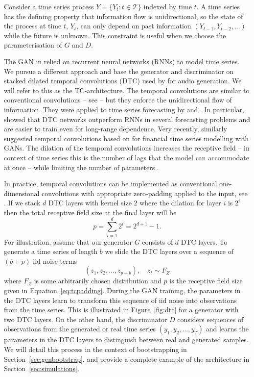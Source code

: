 \documentclass[12pt]{article}
\begin{document}
Consider a time series process $Y = \{ Y_t : t \in \mathcal{T} \}$ indexed by time $t$. A time series has the defining property that information flow is unidirectional, so the state of the process at time $t$, $Y_t$, can only depend on past information $(Y_{t-1}, Y_{t-2}, ...)$ while the future is unknown. This constraint is useful when we choose the parameterisation of $G$ and $D$. 

The GAN in \citet{esteban2017real} relied on recurrent neural networks (RNNs) to model time series. We pursue a different approach and base the generator and discriminator on stacked dilated temporal convolutions (DTC) used by \citet{oord2016wavenet} for audio generation. We will refer to this as the TC-architecture. The temporal convolutions are similar to conventional convolutions -- see \citep[Chp. 3]{goodfellow2016deep} -- but they enforce the unidirectional flow of information. They were applied to time series forecasting by \citet{borovykh2017conditional} and \citet{sen2019think}. In particular, \citet{borovykh2017conditional} showed that DTC networks outperform RNNs in several forecasting problems and are easier to train even for long-range dependence. Very recently, \citet{wiese2020quantgan} similarly suggested temporal convolutions based on \citep{oord2016wavenet} for financial time series modelling with GANs. %
The dilation of the temporal convolutions increases the receptive field -- in context of time series this is the number of lags that the model can accommodate at once -- while limiting the number of parameters \citep{oord2016wavenet,borovykh2017conditional}.

In practice, temporal convolutions can be implemented as conventional one-dimensional convolutions with appropriate zero-padding applied to the input, see \citep{oord2016wavenet}. If we stack $d$ DTC layers with kernel size $2$ where the dilation for layer $i$ is $2^i$ then the total receptive field size at the final layer will be \citep{yu2015multiscale}
\begin{equation}
p =  \sum_{i=1}^d 2^i = 2^{d+1}-1. \label{eq:tcpadding}
\end{equation}
For illustration, assume that our generator $G$ consists of $d$ DTC layers. To generate a time series of length $b$ we slide the DTC layers over a sequence of $(b + p)$ iid noise terms
$$(z_1, z_2, ..., z_{p+b}), \quad z_t \sim F_Z$$
where $F_Z$ is some arbitrarily chosen distribution and $p$ is the receptive field size given in Equation~\ref{eq:tcpadding}. During the GAN training, the parameters in the DTC layers learn to transform this sequence of iid noise into observations from the time series. This is illustrated in Figure~\ref{fig:dtc} for a generator with two DTC layers. On the other hand, the discriminator $D$ considers sequences of observations from the generated or real time series $(y_1, y_2, ..., y_T)$ and learns the parameters in the DTC layers to distinguish between real and generated samples. We will detail this process in the context of bootstrapping in Section~\ref{sec:genbootstrap}, and provide a complete example of the architecture in Section~\ref{sec:simulations}.
\end{document}
